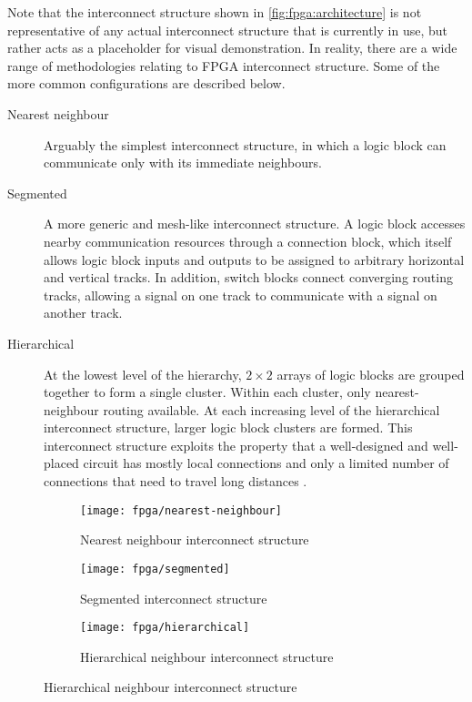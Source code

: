 Note that the interconnect structure shown in \autoref{fig:fpga:architecture} is
not representative of any actual interconnect structure that is currently in
use, but rather acts as a placeholder for visual demonstration. In reality,
there are a wide range of methodologies relating to \gls{FPGA} interconnect
structure. Some of the more common configurations are described below.
\begin{description}
    \item[Nearest neighbour] Arguably the simplest interconnect structure, in
        which a logic block can communicate only with its immediate neighbours.
    \item[Segmented] A more generic and mesh-like interconnect structure. A
        logic block accesses nearby communication resources through a connection
        block, which itself allows logic block inputs and outputs to be assigned
        to arbitrary horizontal and vertical tracks. In addition, switch blocks
        connect converging routing tracks, allowing a signal on one track to
        communicate with a signal on another track.
    \item[Hierarchical] At the lowest level of the hierarchy, $2 \times 2$
        arrays of logic blocks are grouped together to form a single cluster.
        Within each cluster, only nearest-neighbour routing available. At each
        increasing level of the hierarchical interconnect structure, larger
        logic block clusters are formed. This interconnect structure exploits
        the property that a well-designed and well-placed circuit has mostly
        local connections and only a limited number of connections that need to
        travel long distances \cite{Hauck:2007}.
\end{description}

\begin{figure}
    \caption{\gls{FPGA} interconnect structures}
    \label{fig:fpga:interconnect}

    \centering
    \begin{subfigure}[b]{0.3\textwidth}
        \centering
        \texttt{[image: fpga/nearest-neighbour]}
        \caption[Nearest neighbour interconnect structure]{Nearest neighbour
            interconnect structure \cite{Hauck:2007}}
        \label{fig:fpga:interconnect:nearestNeighbour}
    \end{subfigure}
    \quad
    \begin{subfigure}[b]{0.3\textwidth}
        \centering
        \texttt{[image: fpga/segmented]}
        \caption[Segmented interconnect structure]{Segmented interconnect
            structure \cite{Hauck:2007}}
        \label{fig:fpga:interconnect:segmented}
    \end{subfigure}
    \quad
    \begin{subfigure}[b]{0.3\textwidth}
        \centering
        \texttt{[image: fpga/hierarchical]}
        \caption[Hierarchical neighbour interconnect structure]{Hierarchical
            neighbour interconnect structure \cite{Hauck:2007}}
        \label{fig:fpga:interconnect:hierarchical}
    \end{subfigure}
\end{figure}

